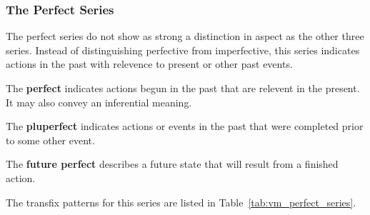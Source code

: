 \documentclass[grammar]{subfiles}
\begin{document}
  \subsubsection{The Perfect Series}
  \label{sssec:vm_perfect_series}

  The perfect series do not show as strong a distinction in aspect as the other three series. 
  Instead of distinguishing perfective from imperfective, this series indicates actions in the past with relevence to present or other past events.   
  
  \begin{itemize*}
    \item The \textbf{perfect} indicates actions begun in the past that are relevent in the present. It may also convey an inferential meaning.
    \item The \textbf{pluperfect} indicates actions or events in the past that were completed prior to some other event. 
    \item The \textbf{future perfect} describes a future state that will result from a finished action.
  \end{itemize*}

  The transfix patterns for this series are listed in Table~\ref{tab:vm_perfect_series}. 
\end{document}
